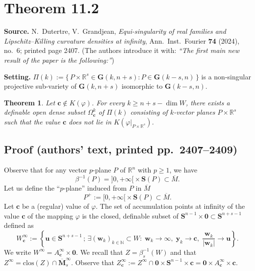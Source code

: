 \documentclass[11pt]{article}
\newtheorem{theorem}{Theorem}
\begin{document}
\section*{Theorem 11.2}

\textbf{Source.} N.~Dutertre, V.~Grandjean, \emph{Equi-singularity of real families and
Lipschitz--Killing curvature densities at infinity}, Ann.\ Inst.\ Fourier \textbf{74} (2024), no.~6;
printed page 2407.  (The authors introduce it with: \emph{``The first main new result of the paper is
the following:''})

\medskip\noindent
\textbf{Setting.} $\Pi(k) := \{\,P\times\mathbb{R}^s\in\mathbf G(k,n+s) : P\in\mathbf G(k-s,n)\,\}$
is a non-singular projective sub-variety of $\mathbf G(k,n+s)$ isomorphic to $\mathbf G(k-s,n)$.

\begin{theorem}
Let $\mathbf c\notin K(\varphi)$. For every $k\geqslant n+s-\dim W$, there exists a definable open dense
subset $\Omega_{\mathbf c}^k$ of $\Pi(k)$ consisting of $k$-vector planes $P\times\mathbb{R}^s$ such
that the value $\mathbf c$ does not lie in $K(\varphi|_{P\times\mathbb{R}^s})$.
\end{theorem}

\subsection*{Proof (authors' text, printed pp.~2407--2409)}

Observe that for any vector $p$-plane $P$ of $\mathbb{R}^n$ with $p\geqslant 1$, we have
\[
\beta^{-1}(P) = {]0,+\infty[}\times\mathbf S(P)\subset\overline M .
\]
Let us define the ``$p$-plane'' induced from $P$ in $\overline M$
\[
P^{+} := [0,+\infty[{}\times\mathbf S(P)\subset\overline M .
\]
Let $\mathbf c$ be a (regular) value of $\varphi$. The set of accumulation points at infinity of the
value $\mathbf c$ of the mapping $\varphi$ is the closed, definable subset of
$\mathbf S^{n-1}\times\mathbf 0\subset\mathbf S^{n+s-1}$ defined as
\begin{equation}
W_{\mathbf c}^{\infty} :=
\left\{ \mathbf u\in\mathbf S^{n+s-1} \,;\, \exists(\mathbf w_k)_{k\in\mathbb N}\subset W:\;
\mathbf w_k\to\infty,\; \mathbf y_k\to\mathbf c,\; \frac{\mathbf w_k}{|\mathbf w_k|}\to\mathbf u \right\}.
\tag{11.1}
\end{equation}
We write $W^{\infty} = A_{\mathbf c}^{\infty}\times\mathbf 0$. We recall that
$Z = \beta_s^{-1}(W)$ and that $Z^{\infty} = \mathrm{clos}(Z)\cap\overline{\mathbf M}_s^{\infty}$.
Observe that $Z_{\mathbf c}^{\infty} := Z^{\infty}\cap\mathbf 0\times\mathbf S^{n-1}\times\mathbf c
= \mathbf 0\times A_{\mathbf c}^{\infty}\times\mathbf c$.
\end{document}
